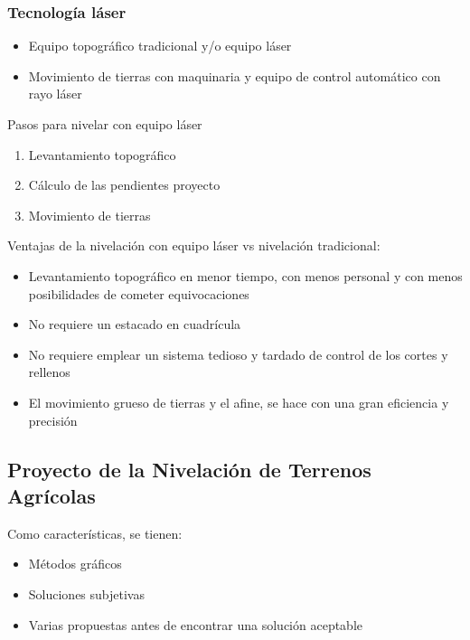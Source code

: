 \subsubsection{Tecnología láser}
\begin{itemize}
    \item Equipo topográfico tradicional y/o equipo láser
    \item Movimiento de tierras con maquinaria y equipo de control automático con rayo láser
\end{itemize}
Pasos para nivelar con equipo láser
\begin{enumerate}
    \item Levantamiento topográfico
    \item Cálculo de las pendientes proyecto
    \item Movimiento de tierras
\end{enumerate}
Ventajas de la nivelación con equipo láser vs nivelación tradicional:
\begin{itemize}
    \item Levantamiento topográfico en menor tiempo, con menos personal y con menos posibilidades de cometer equivocaciones
    \item No requiere un estacado en cuadrícula
    \item No requiere emplear un sistema tedioso y tardado de control de los cortes y rellenos
    \item El movimiento grueso de tierras y el afine, se hace con una gran eficiencia y precisión
\end{itemize}
\subsection{Proyecto de la Nivelación de Terrenos Agrícolas}
\Schema{-1.4ex}{15ex}
{} { \Schema{-1ex}{4ex}
	{}
	{  
		{}
		\medskip
		 
		{} 
	}
	\Schema{-1ex}{4ex}
	{}
	{
		\medskip
	}
	\Schema{-1ex}{3ex}
	{}
	{
	}
}

Como características, se tienen:
\begin{itemize}
  \item Métodos gráficos
  \item Soluciones subjetivas
  \item Varias propuestas antes de encontrar una solución aceptable
\end{itemize}

